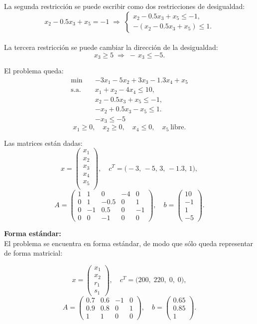 La segunda restricción se puede escribir como dos restricciones de desigualdad:
\[
x_2 - 0.5x_3 + x_5 = -1
\;\Longrightarrow\;
\begin{cases}
x_2 - 0.5x_3 + x_5 \le -1,\\
-(x_2 - 0.5x_3 + x_5)\le 1.
\end{cases}
\]\\

La tercera restricción se puede cambiar la dirección de la desigualdad:
\[
x_3 \ge 5
\;\Longrightarrow\;
-\,x_3 \le -5.
\]

El problema queda:
\[
\begin{aligned}
\min\quad & -3x_1 -5x_2 +3x_3 -1.3x_4 +x_5 \\
\text{s.a.}\quad
& x_1 + x_2 -4x_4 \le 10,\\
&x_2 - 0.5x_3 + x_5 \le -1,\\
&-x_2 + 0.5x_3 - x_5\le 1. \\
& -x_3 \le -5
\end{aligned}
\]
\[
x_1\ge0,\quad x_2\ge0,\quad x_4\le0,\quad x_5\ \text{libre}.
\]

Las matrices están dadas:
\[
x = \begin{pmatrix}
x_1\\ x_2\\ x_3\\ x_4\\ x_5\\ 
\end{pmatrix},
\quad
c^T = \bigl(-3,\,-5,\,3,\,-1.3,\,1),
\]
\[
A = 
\begin{pmatrix}
1 & 1   & 0    & -4 & 0\\
0 & 1   & -0.5 & 0  & 1\\
0 & -1  & 0.5  & 0  & -1\\
0 & 0   & -1   & 0  & 0
\end{pmatrix},\quad
b = \begin{pmatrix}10\\-1\\1\\-5\end{pmatrix}.
\]

\textbf{Forma estándar:}\\

El problema se encuentra en forma estándar, de modo que sólo queda representar de forma matricial:

\[
x = \begin{pmatrix}
x_1\\
x_2\\
r_1\\
s_1
\end{pmatrix},
\quad
c^T = \bigl(200,\;220,\;0,\;0\bigr),
\]
\[
A = 
\begin{pmatrix}
0.7 & 0.6 & -1 & 0\\
0.9 & 0.8 &  0 & 1\\
1   & 1   &  0 & 0
\end{pmatrix},
\quad
b = \begin{pmatrix}
0.65\\
0.85\\
1
\end{pmatrix}.
\]

